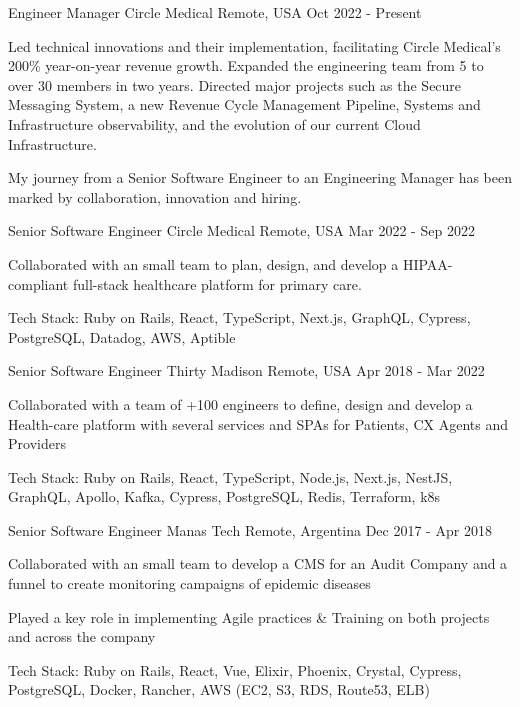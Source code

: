 
\begin{cventries}

  \cventry
    {Engineer Manager}
    {Circle Medical}
    {Remote, USA}
    {Oct 2022 - Present}
    {
      \begin{cvitems}
        \item {Led technical innovations and their implementation, facilitating Circle Medical's 200\% year-on-year revenue growth. Expanded the engineering team from 5 to over 30 members in two years. Directed major projects such as the Secure Messaging System, a new Revenue Cycle Management Pipeline, Systems and Infrastructure observability, and the evolution of our current Cloud Infrastructure.}
        \item {My journey from a Senior Software Engineer to an Engineering Manager has been marked by collaboration, innovation and hiring.}
      \end{cvitems}
    }

  \cventry
    {Senior Software Engineer}
    {Circle Medical}
    {Remote, USA}
    {Mar 2022 - Sep 2022}
    {
      \begin{cvitems}
        \item {Collaborated with an small team to plan, design, and develop a HIPAA-compliant full-stack healthcare platform for primary care.}
        \item {Tech Stack: Ruby on Rails, React, TypeScript, Next.js, GraphQL, Cypress, PostgreSQL, Datadog, AWS, Aptible}
      \end{cvitems}
    }

  \cventry
    {Senior Software Engineer}
    {Thirty Madison}
    {Remote, USA}
    {Apr 2018 - Mar 2022}
    {
      \begin{cvitems}
        \item {Collaborated with a team of +100 engineers to define, design and develop a Health-care platform with several services and SPAs for Patients, CX Agents and Providers}
        \item {Tech Stack: Ruby on Rails, React, TypeScript, Node.js, Next.js, NestJS, GraphQL, Apollo, Kafka, Cypress, PostgreSQL, Redis, Terraform, k8s}
      \end{cvitems}
    }

  \cventry
    {Senior Software Engineer}
    {Manas Tech}
    {Remote, Argentina}
    {Dec 2017 - Apr 2018}
    {
      \begin{cvitems}
        \item {Collaborated with an small team to develop a CMS for an Audit Company and a funnel to create monitoring campaigns of epidemic diseases}
        \item {Played a key role in implementing Agile practices \& Training on both projects and across the company}
        \item {Tech Stack: Ruby on Rails, React, Vue, Elixir, Phoenix, Crystal, Cypress, PostgreSQL, Docker, Rancher, AWS (EC2, S3, RDS, Route53, ELB)}
      \end{cvitems}
    }


\end{cventries}
